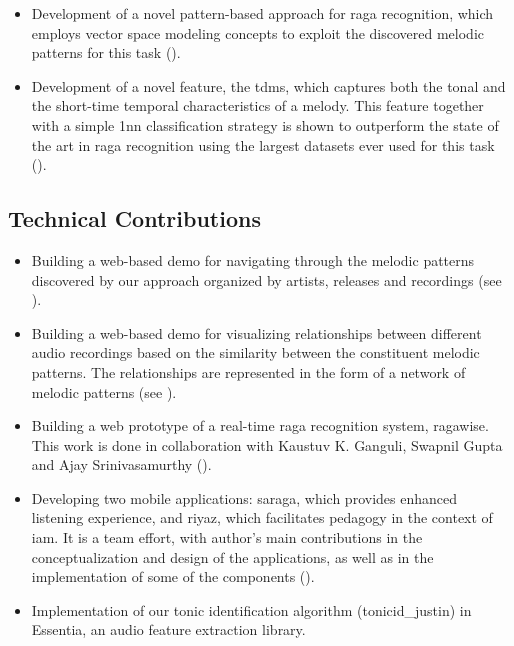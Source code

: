 \begin{itemize}
	\item Development of a novel pattern-based approach for \gls{raga} recognition, which employs vector space modeling concepts to exploit the discovered melodic patterns for this task (). 
	
	\item Development of a novel feature, the \acrfull{tdms}, which captures both the tonal and the short-time temporal characteristics of a melody. This feature together with a simple \acrlong{1nn} classification strategy is shown to outperform the state of the art in \gls{raga} recognition using the largest datasets ever used for this task (). 
	
\end{itemize}

\subsection*{Technical Contributions}

\begin{itemize}
	\item Building a web-based demo for navigating through the melodic patterns discovered by our approach organized by artists, releases and recordings (see ). 
	\item Building a web-based demo for visualizing relationships between different audio recordings based on the similarity between the constituent melodic patterns. The relationships are represented in the form of a network of melodic patterns (see ).
	\item Building a web prototype of a real-time \gls{raga} recognition system, \gls{ragawise}. This work is done in collaboration with Kaustuv K. Ganguli, Swapnil Gupta and Ajay Srinivasamurthy ().
	\item Developing two mobile applications: \gls{saraga}, which provides enhanced listening experience, and \gls{riyaz}, which facilitates pedagogy in the context of \gls{iam}. It is a team effort, with author's main contributions in the conceptualization and design of the applications, as well as in the implementation of some of the components ().
	\item Implementation of our tonic identification algorithm (\acrshort{tonicid_justin}) in Essentia, an audio feature extraction library.		
\end{itemize}

